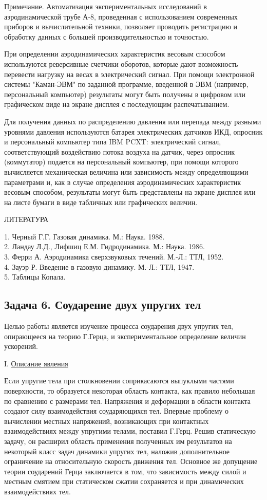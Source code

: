 \documentclass[specialist, subf, href, colorlinks=true, 14pt, final]{disser}
\theoremstyle{definition}
\newcommand{\anonsubsection}[1]{\subsection*{#1}\addcontentsline{toc}{subsection}{#1}}
\newcommand{\npart}[2]{\noindent #1. \underline{#2}}
\begin{document}
Примечание. Автоматизация экспериментальных исследований в аэродинамической трубе А-8, проведенная с использованием современных приборов и вычислительной техники, позволяет проводить регистрацию и обработку данных с большей производительностью и точностью.

При определении аэродинамических характеристик весовым способом используются реверсивные счетчики оборотов, которые дают возможность перевести нагрузку на весах в электрический сигнал. При помощи электронной системы "Каман-ЭВМ"{} по заданной программе, введенной в ЭВМ (например, персональный компьютер) результаты могут быть получены в цифровом или графическом виде на экране дисплея с последующим распечатыванием.

Для получения данных по распределению давления или перепада между разными уровнями давления используются батарея электрических датчиков ИКД, опросник и персональный компьютер типа IBM PCXT: электрический сигнал, соответствующий воздействию потока воздуха на датчик, через опросник (коммутатор) подается на персональный компьютер, при помощи которого вычисляется механическая величина или зависимость между определяющими параметрами и, как в случае определения аэродинамических характеристик весовым способом, результаты могут быть представлены на экране дисплея или на листе бумаги в виде табличных или графических величин.\\

\begin{center}
ЛИТЕРАТУРА
\end{center}
1. Черный Г.Г. Газовая динамика. М.: Наука. 1988.\\
2. Ландау Л.Д., Лифшиц Е.М. Гидродинамика. М.: Наука. 1986.\\
3. Ферри А. Аэродинамика сверхзвуковых течений. М.-Л.: ТТЛ, 1952.\\
4. Зауэр Р. Введение в газовую динамику. М.-Л.: ТТЛ, 1947.\\
5. Таблицы Копала.

\newpage
\anonsubsection{Задача 6. Соударение двух упругих тел}

Целью работы является изучение процесса соударения двух упругих тел, опирающееся на теорию Г.Герца, и экспериментальное определение величин ускорений.

\npart{I}{Описание явления}

Если упругие тела при столкновении соприкасаются выпуклыми частями поверхности, то образуется некоторая область контакта, как правило небольшая по сравнению с размерами тел. Напряжения и деформации в области контакта создают силу взаимодействия соударяющихся тел. Впервые проблему о вычислении местных напряжений, возникающих при контактных взаимодействиях между упругими телами, поставил Г.Герц. Решив статическую задачу, он расширил область применения полученных им результатов на некоторый класс задач динамики упругих тел, наложив дополнительное ограничение на относительную скорость движения тел. Основное же допущение теории соударений Герца заключается в том, что  зависимость между силой и местным смятием при статическом сжатии сохраняется и при динамических взаимодействиях тел. 
\end{document}
